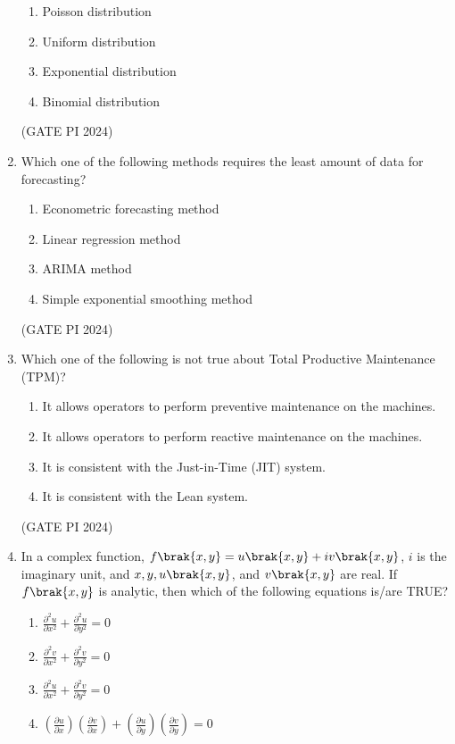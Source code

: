 \documentclass[journal,12pt,onecolumn]{IEEEtran}
\theoremstyle{remark}
\begin{document}
\begin{enumerate}
\begin{multicols}{2}
\begin{enumerate}
    \item Poisson distribution
    \item Uniform distribution
    \item Exponential distribution
    \item Binomial distribution
\end{enumerate}
\end{multicols}

\hfill (GATE PI 2024)

\item Which one of the following methods requires the least amount of data for forecasting?

\begin{enumerate}
    \item Econometric forecasting method
    \item Linear regression method
    \item ARIMA method
    \item Simple exponential smoothing method
\end{enumerate}

\hfill (GATE PI 2024)

\item Which one of the following is not true about Total Productive Maintenance (TPM)?

\begin{enumerate}
    \item It allows operators to perform preventive maintenance on the machines.
    \item It allows operators to perform reactive maintenance on the machines.
    \item It is consistent with the Just-in-Time (JIT) system.
    \item It is consistent with the Lean system.
\end{enumerate}

\hfill (GATE PI 2024)

\item In a complex function, $f\brak{x,y} = u\brak{x,y} + i v\brak{x,y}$, $i$ is the imaginary unit, and $x, y, u\brak{x,y}$, and $v\brak{x,y}$ are real. If $f\brak{x,y}$ is analytic, then which of the following equations is/are TRUE?
\begin{enumerate}
\setlength{\itemsep}{1em}
\item $\frac{\partial^2 u}{\partial x^2} + \frac{\partial^2 u}{\partial y^2} = 0$
\item $\frac{\partial^2 v}{\partial x^2} + \frac{\partial^2 v}{\partial y^2} = 0$
\item $\frac{\partial^2 u}{\partial x^2} + \frac{\partial^2 v}{\partial y^2} = 0$
\item $\left( \frac{\partial u}{\partial x} \right) \left( \frac{\partial v}{\partial x} \right) + \left( \frac{\partial u}{\partial y} \right) \left( \frac{\partial v}{\partial y} \right) = 0$
\end{enumerate}


\end{enumerate}
\end{document}
